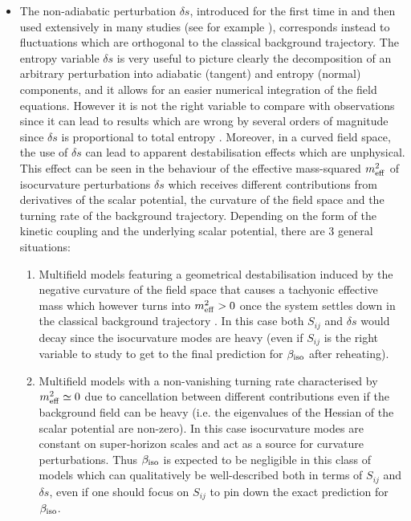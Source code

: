 \documentclass[a4paper,11pt]{article}
\begin{document}
\begin{itemize}
\item The non-adiabatic perturbation $\delta s$, introduced for the first time in \cite{Gordon:2000hv} and then used extensively in many studies (see for example \cite{Achucarro:2010da, Cremonini:2010sv}), corresponds instead to fluctuations which are orthogonal to the classical background trajectory. The entropy variable $\delta s$ is very useful to picture clearly the decomposition of an arbitrary perturbation into adiabatic (tangent) and entropy (normal) components, and it allows for an easier numerical integration of the field equations. However it is not the right variable to compare with observations since it can lead to results which are wrong by several orders of magnitude since $\delta s$ is proportional to total entropy \cite{Huston:2011fr, Huston:2013kgl, Wands:2002bn}. Moreover, in a curved field space, the use of $\delta s$ can lead to apparent destabilisation effects which are unphysical. This effect can be seen in the behaviour of the effective mass-squared $m_{\rm eff}^2$ of isocurvature perturbations $\delta s$ which receives different contributions from derivatives of the scalar potential, the curvature of the field space and the turning rate of the background trajectory. Depending on the form of the kinetic coupling and the underlying scalar potential, there are 3 general situations: 
\begin{enumerate}
\item Multifield models featuring a geometrical destabilisation \cite{Renaux-Petel:2015mga} induced by the negative curvature of the field space that causes a tachyonic effective mass \cite{Gong:2011uw} which however turns into $m_{\rm eff}^2>0$ once the system settles down in the classical background trajectory \cite{Cicoli:2018ccr, Christodoulidis:2019mkj}. In this case both $S_{ij}$ and $\delta s$ would decay since the isocurvature modes are heavy (even if $S_{ij}$ is the right variable to study to get to the final prediction for $\beta_{\rm iso}$ after reheating).

\item Multifield models with a non-vanishing turning rate \cite{Achucarro:2016fby} characterised by $m_{\rm eff}^2\simeq 0$ due to cancellation between different contributions even if the background field can be heavy (i.e. the eigenvalues of the Hessian of the scalar potential are non-zero). In this case isocurvature modes are constant on super-horizon scales and act as a source for curvature perturbations. Thus $\beta_{\rm iso}$ is expected to be negligible in this class of models which can qualitatively be well-described both in terms of $S_{ij}$ and $\delta s$, even if one should focus on $S_{ij}$ to pin down the exact prediction for $\beta_{\rm iso}$.


\end{enumerate}
\end{itemize}
\end{document}
